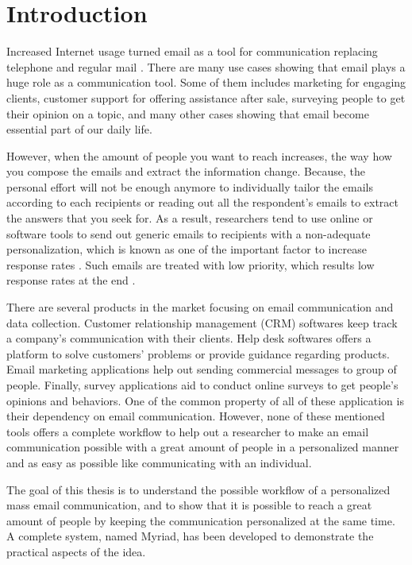 \chapter{Introduction}
\label{chp:Intro}
Increased Internet usage turned email as a tool for communication replacing telephone and regular mail \citep{Norman2000,Madden2003}. There are many use cases showing that email plays a huge role as a communication tool. Some of them includes marketing for engaging clients, customer support for offering assistance after sale, surveying people to get their opinion on a topic, and many other cases showing that email become essential part of our daily life.
\vspace{1cm}

However, when the amount of people you want to reach increases, the way how you compose the emails and extract the information change. Because, the personal effort will not be enough anymore to individually tailor the emails according to each recipients or reading out all the respondent's emails to extract the answers that you seek for. As a result, researchers tend to use online or software tools to send out generic emails to recipients with a non-adequate personalization, which is known as one of the important factor to increase response rates \citep{Dillman1991,Schaefer1998}. Such emails are treated with low priority, which results low response rates at the end \citep[page 272]{DillmanDonA.SmythJoleneD.Christian2009}.
\vspace{1cm}

There are several products in the market focusing on email communication and data collection. Customer relationship management (CRM) softwares keep track a company's communication with their clients. Help desk softwares offers a platform to solve customers' problems or provide guidance regarding products. Email marketing applications help out sending commercial messages to group of people. Finally, survey applications aid to conduct online surveys to get people's opinions and behaviors. One of the common property of all of these application is their dependency on email communication. However, none of these mentioned tools offers a complete workflow to help out a researcher to make an email communication possible with a great amount of people in a personalized manner and as easy as possible like communicating with an individual.
\vspace{1cm}

The goal of this thesis is to understand the possible workflow of a personalized mass email communication, and to show that it is possible to reach a great amount of people by keeping the communication personalized at the same time. A complete system, named Myriad, has been developed to demonstrate the practical aspects of the idea.


